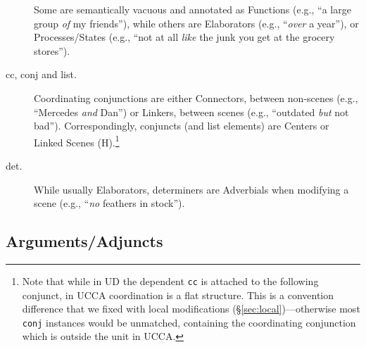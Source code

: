 \documentclass[11pt,a4paper]{article}
\begin{document}
\begin{description}
    Some are semantically vacuous and annotated as Functions
    (e.g., ``a large group \textit{of} my friends''),
    while others are Elaborators (e.g., ``\textit{over} a year''),
    or Processes/States
    (e.g., ``not at all \textit{like} the junk you get at the grocery stores'').
    \item[cc, conj and list.]
    Coordinating conjunctions are either Connectors, between non-scenes
    (e.g., ``Mercedes \textit{and} Dan'')
    or Linkers, between scenes
    (e.g., ``outdated \textit{but} not bad'').
    Correspondingly, conjuncts (and list elements)
    are Centers or Linked Scenes (H).\footnote{Note
    that while in UD the dependent \texttt{cc} is attached to the following conjunct,
    in UCCA coordination is a flat structure.
    This is a convention difference that we fixed with local modifications
    (\S\ref{sec:local})---otherwise most \texttt{conj} instances would be unmatched,
    containing the coordinating conjunction which is outside the unit in UCCA.}
    \item[det.]
    While usually Elaborators,
    determiners are Adverbials when modifying a scene
    (e.g., ``\textit{no} feathers in stock'').
\end{description}

\subsection{Arguments/Adjuncts}\label{sec:arguments}
\end{document}
